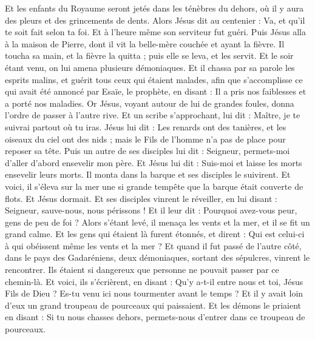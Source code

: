 \begin{multicols}{2}
Et les enfants du Royaume seront jetés dans les ténèbres du dehors, où il y aura des pleurs et des grincements de dents.
Alors Jésus dit au centenier : Va, et qu'il te soit fait selon ta foi. Et à l'heure même son serviteur fut guéri.
Puis Jésus alla à la maison de Pierre, dont il vit la belle-mère couchée et ayant la fièvre.
Il toucha sa main, et la fièvre la quitta ; puis elle se leva, et les servit.
Et le soir étant venu, on lui amena plusieurs démoniaques. Et il chassa par sa parole les esprits malins, et guérit tous ceux qui étaient malades,
afin que s'accomplisse ce qui avait été annoncé par Esaïe, le prophète, en disant : Il a pris nos faiblesses et a porté nos maladies.
Or Jésus, voyant autour de lui de grandes foules, donna l'ordre de passer à l'autre rive.
Et un scribe s'approchant, lui dit : Maître, je te suivrai partout où tu iras.
Jésus lui dit : Les renards ont des tanières, et les oiseaux du ciel ont des nids ; mais le Fils de l'homme n'a pas de place pour reposer sa tête.
Puis un autre de ses disciples lui dit : Seigneur, permets-moi d'aller d'abord ensevelir mon père.
Et Jésus lui dit : Suis-moi et laisse les morts ensevelir leurs morts.
Il monta dans la barque et ses disciples le suivirent.
Et voici, il s'éleva sur la mer une si grande tempête que la barque était couverte de flots. Et Jésus dormait.
Et ses disciples vinrent le réveiller, en lui disant : Seigneur, sauve-nous, nous périssons !
Et il leur dit : Pourquoi avez-vous peur, gens de peu de foi ? Alors s'étant levé, il menaça les vents et la mer, et il se fit un grand calme.
Et les gens qui étaient là furent étonnés, et dirent : Qui est celui-ci à qui obéissent même les vents et la mer ?
Et quand il fut passé de l'autre côté, dans le pays des Gadaréniens, deux démoniaques, sortant des sépulcres, vinrent le rencontrer. Ils étaient si dangereux que personne ne pouvait passer par ce chemin-là.
Et voici, ils s'écrièrent, en disant : Qu'y a-t-il entre nous et toi, Jésus Fils de Dieu ? Es-tu venu ici nous tourmenter avant le temps ?
Et il y avait loin d'eux un grand troupeau de pourceaux qui paissaient.
Et les démons le priaient en disant : Si tu nous chasses dehors, permets-nous d'entrer dans ce troupeau de pourceaux.

\end{multicols}
